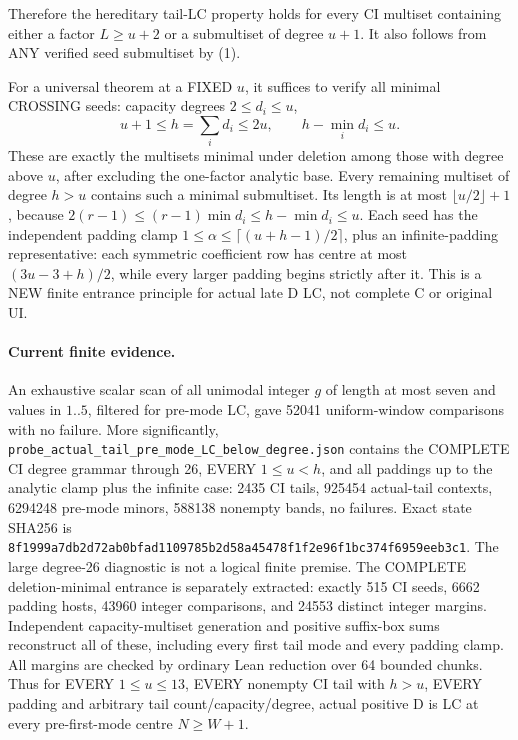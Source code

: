 Therefore the hereditary tail-LC property holds for every CI multiset
containing either a factor $L\ge u+2$ or a submultiset of degree
$u+1$. It also follows from ANY verified seed submultiset by (1).

For a universal theorem at a FIXED $u$, it suffices to verify all
minimal CROSSING seeds: capacity degrees $2\le d_i\le u$,
\[
 u+1\le h=\sum_i d_i\le2u,\qquad h-\min_i d_i\le u.
\]
These are exactly the multisets minimal under deletion among those
with degree above $u$, after excluding the one-factor analytic base.
Every remaining multiset of degree $h>u$ contains such a minimal
submultiset. Its length is at most $\lfloor u/2\rfloor+1$, because
$2(r-1)\le(r-1)\min d_i\le h-\min d_i\le u$.
Each seed has the independent padding clamp
$1\le\alpha\le\lceil(u+h-1)/2\rceil$, plus an infinite-padding
representative: each symmetric coefficient row has centre at most
$(3u-3+h)/2$, while every larger padding begins strictly after it.
This is a NEW finite entrance principle for actual late D LC, not
complete C or original UI.

\paragraph{Current finite evidence.}
An exhaustive scalar scan of all unimodal integer $g$ of length at
most seven and values in $1..5$, filtered for pre-mode LC, gave
52041 uniform-window comparisons with no failure.
More significantly, \texttt{probe\_actual\_tail\_pre\_mode\_LC\_below\_degree.json}
contains the COMPLETE CI degree grammar through 26, EVERY $1\le u<h$,
and all paddings up to the analytic clamp plus the infinite case:
2435 CI tails, 925454 actual-tail contexts, 6294248 pre-mode minors,
588138 nonempty bands, no failures. Exact state SHA256 is
\texttt{8f1999a7db2d72ab0bfad1109785b2d58a45478f1f2e96f1bc374f6959eeb3c1}.
The large degree-26 diagnostic is not a logical finite premise.
The COMPLETE deletion-minimal entrance is separately extracted:
exactly 515 CI seeds, 6662 padding hosts, 43960 integer comparisons,
and 24553 distinct integer margins. Independent capacity-multiset
generation and positive suffix-box sums reconstruct all of these,
including every first tail mode and every padding clamp. All margins
are checked by ordinary Lean reduction over 64 bounded chunks.
Thus for EVERY $1\le u\le13$, EVERY nonempty CI tail with $h>u$,
EVERY padding and arbitrary tail count/capacity/degree, actual positive
D is LC at every pre-first-mode centre $N\ge W+1$.

